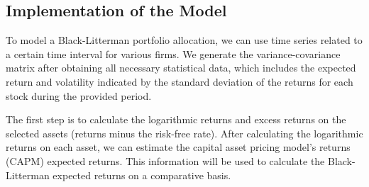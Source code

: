 \subsection{Implementation of the Model}
To model a Black-Litterman portfolio allocation, we can use time series related to a certain time interval for various firms.
We generate the variance-covariance matrix after obtaining all necessary statistical data, which includes the expected return and volatility indicated by the standard deviation of the returns for each stock during the provided period.

The first step is to calculate the logarithmic returns and excess returns on the selected assets (returns minus the risk-free rate). After calculating the logarithmic returns on each asset, we can estimate the capital asset pricing model’s returns (CAPM) expected returns. This information will be used to calculate the Black-Litterman expected returns on a comparative basis.
